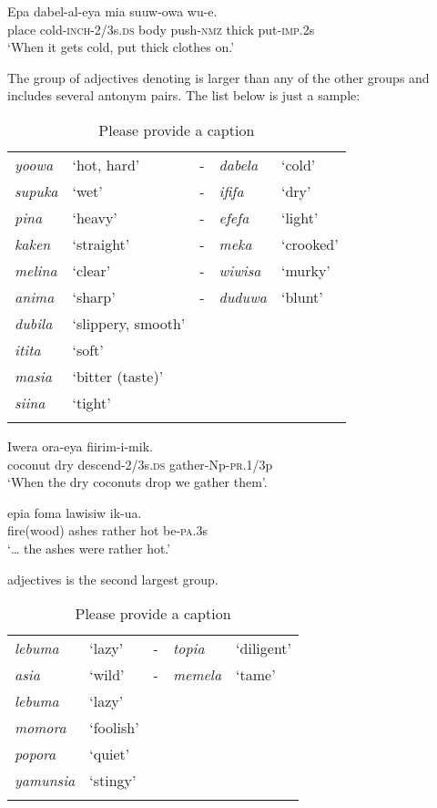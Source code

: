 \ea%
\label{ex:3:x77}
\gll Epa dabel-al-eya mia suuw-owa   wu-e. \\
place cold-\textsc{inch}-2/3s.\textsc{ds} body push-\textsc{nmz} thick put-\textsc{imp}.2s\\
\glt`When it gets cold, put thick clothes on.'
\z

The group of adjectives denoting  is larger than any of the other groups and includes several antonym pairs. The list below is just a sample:

\begin{table}
\caption{Please provide a caption}
\label{} 
\begin{tabular}{>{\itshape}llc>{\itshape}ll}
\mytoprule
yoowa &`hot, hard' &- &dabela &`cold'\\
supuka &`wet' &- &ififa &`dry'\\
pina &`heavy' &- &efefa &`light'\\
kaken &`straight' &- &meka &`crooked'\\
melina &`clear' &- &wiwisa &`murky'\\
anima &`sharp' &- &duduwa &`blunt'\\
dubila &`slippery, smooth'&&&\\
itita &`soft'&&&\\
masia &`bitter (taste)'&&&\\
siina &`tight'&&&\\
\mybottomrule
\end{tabular}
\end{table}

\ea%
\label{ex:3:x78}
\gll Iwera  ora-eya fiirim-i-mik. \\
coconut dry descend-2/3s.\textsc{ds} gather-Np-\textsc{pr}.1/3p\\
\glt`When the dry coconuts drop we gather them'.
\z

\ea%
\label{ex:3:x1758}
\gll {\dots}epia foma lawisiw  ik-ua. \\
fire(wood) ashes rather hot be-\textsc{pa}.3s\\
\glt`{\dots} the ashes were rather hot.'
\z

 adjectives is the second largest group. 


\begin{table}
\caption{Please provide a caption}
\label{} 
\begin{tabular}{>{\itshape}llc>{\itshape}ll}
\mytoprule
lebuma &`lazy' &- &topia &`diligent'\\
asia &`wild' &- &memela &`tame'\\
lebuma &`lazy'&&&\\
momora &`foolish'&&&\\
popora &`quiet'&&&\\
yamunsia &`stingy'&&&\\
\mybottomrule
\end{tabular}
\end{table}

